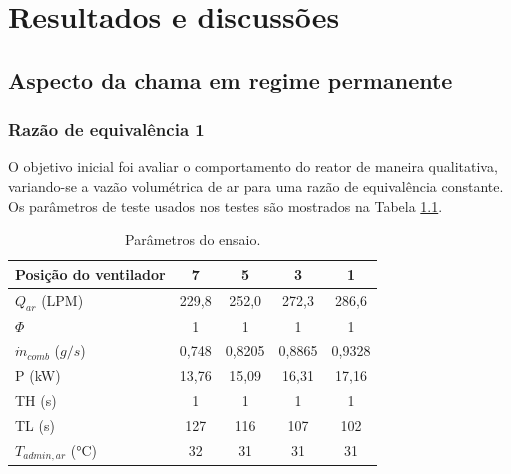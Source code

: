 \chapter{Resultados e discussões}

\section{Aspecto da chama em regime permanente}

\subsection{Razão de equivalência 1}
O objetivo inicial foi avaliar o comportamento do reator de maneira qualitativa, variando-se a vazão volumétrica de ar para uma razão de equivalência constante. Os parâmetros de teste usados nos testes são mostrados na Tabela \ref{tab:phi1}.

\begin{table}[!htbp]
	\centering
	\small
	\renewcommand{\arraystretch}{1.3}
	\caption{Parâmetros do ensaio.}%
	\label{tab:phi1}
        \begin{tabular}{|l|c|c|c|c|}
        \hline
        \textbf{Posição do ventilador} & \multicolumn{1}{c|}{\textbf{7}} & \textbf{5}              & \textbf{3} & \textbf{1} \\ \hline
        ${Q}_{ar}$ (LPM)           & 229,8                           & 252,0                   & 272,3      & 286,6      \\ \hline
        $\Phi$                         & 1                               & 1                       & 1          & 1          \\ \hline
        $\dot{m}_{comb}$ ($g/s$)       & 0,748                           & 0,8205                  & 0,8865     & 0,9328     \\ \hline
        P (kW)                         & 13,76                           & 15,09                   & 16,31      & 17,16      \\ \hline
        TH (s)                         & 1                               & 1                       & 1          & 1          \\ \hline
        TL (s)                         & 127                             & 116                     & 107        & 102        \\ \hline
        $T_{admin, ar}$ (°C)           & 32                              & 31 & 31         & 31         \\ \hline
        \end{tabular}
    \vspace{2mm}
\end{table}

